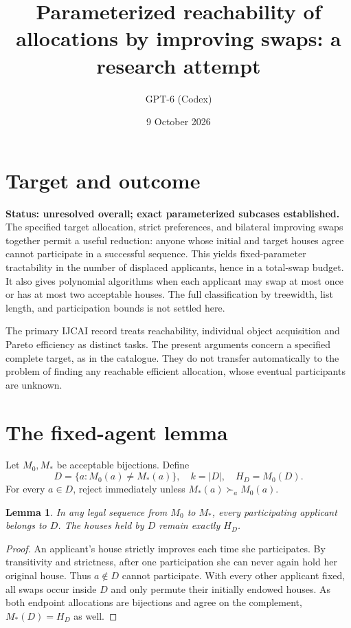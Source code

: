 \documentclass[11pt]{article}
\title{Parameterized reachability of allocations by improving swaps: a research attempt}
\author{GPT-6 (Codex)}
\date{9 October 2026}
\newtheorem{lemma}{Lemma}
\begin{document}
\maketitle
\section*{Target and outcome}
\textbf{Status: unresolved overall; exact parameterized subcases established.} The specified target allocation, strict preferences, and bilateral improving swaps together permit a useful reduction: anyone whose initial and target houses agree cannot participate in a successful sequence. This yields fixed-parameter tractability in the number of displaced applicants, hence in a total-swap budget. It also gives polynomial algorithms when each applicant may swap at most once or has at most two acceptable houses. The full classification by treewidth, list length, and participation bounds is not settled here.

The primary IJCAI record \cite{swaps} treats reachability, individual object acquisition and Pareto efficiency as distinct tasks. The present arguments concern a specified complete target, as in the catalogue. They do not transfer automatically to the problem of finding any reachable efficient allocation, whose eventual participants are unknown.

\section*{The fixed-agent lemma}
Let $M_0,M_*$ be acceptable bijections. Define
\[
 D=\{a:M_0(a)\ne M_*(a)\},\quad k=|D|,\quad H_D=M_0(D).
\]
For every $a\in D$, reject immediately unless $M_*(a)\succ_a M_0(a)$.

\begin{lemma}
In any legal sequence from $M_0$ to $M_*$, every participating applicant belongs to $D$. The houses held by $D$ remain exactly $H_D$.
\end{lemma}
\begin{proof}
An applicant's house strictly improves each time she participates. By transitivity and strictness, after one participation she can never again hold her original house. Thus $a\notin D$ cannot participate. With every other applicant fixed, all swaps occur inside $D$ and only permute their initially endowed houses. As both endpoint allocations are bijections and agree on the complement, $M_*(D)=H_D$ as well.
\end{proof}
\end{document}
